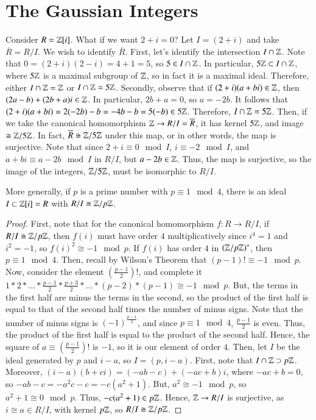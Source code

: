 \documentclass[12pt, a4paper, oneside, openright, titlepage]{book}
\begin{document}
\section{\textsection The Gaussian Integers}

\begin{eg}
        Consider $R = \mathbb Z[i]$. What if we want $2+i = 0$? Let $I = (2+i)$ and take $\overline{R} = R/I$. We wish to identify $\overline{R}$. First, let's identify the intersection $I \cap \mathbb Z$. Note that $0 = (2+i)(2-i) = 4+1 = 5$, so $5 \in I\cap \mathbb Z$. In particular, $5\mathbb Z \subset I\cap \mathbb Z$, where $5\mathbb Z$ is a maximal subgroup of $\mathbb Z$, so in fact it is a maximal ideal. Therefore, either $I\cap \mathbb Z = \mathbb Z$ or $I\cap \mathbb Z = 5\mathbb Z$. Secondly, observe that if $(2+i)(a+bi) \in \mathbb Z$, then $(2a-b)+(2b+a)i \in \mathbb Z$. In particular, $2b+a = 0$, so $a = -2b$. It follows that $(2+i)(a+bi) = 2(-2b)-b = -4b - b = 5(-b) \in 5\mathbb Z$. Therefore, $I\cap \mathbb Z = 5\mathbb Z$. Then, if we take the canonical homomorphism $\mathbb Z\rightarrow R/I = \overline{R}$, it has kernel $5\mathbb Z$, and image $\cong \mathbb Z/5\mathbb Z$. In fact, $\overline{R} \cong \mathbb Z/5\mathbb Z$ under this map, or in other words, the map is surjective. Note that since $2+i \equiv 0 \mod I$, $i \equiv -2 \mod I$, and $a+bi \equiv a-2b \mod I$ in $R/I$, but $a-2b \in \mathbb Z$. Thus, the map is surjective, so the image of the integers, $\mathbb Z/5\mathbb Z$, must be isomorphic to $R/I$.
\end{eg}

\begin{thm}
        More generally, if $p$ is a prime number with $p\equiv 1 \mod 4$, there is an ideal $I \subset \mathbb Z[i]=R$ with $R/I \cong \mathbb Z/p\mathbb Z$.
\end{thm}
\begin{proof}
        First, note that for the canonical homomorphism $f:R\rightarrow R/I$, if $R/I \cong \mathbb Z/p\mathbb Z$, then $f(i)$ must have order $4$ multiplicatively since $i^4 = 1$ and $i^2 = -1$, so $f(i)^2 \cong -1 \mod p$. If $f(i)$ has order $4$ in $(\mathbb Z/p\mathbb Z)^*$, then $p \equiv 1 \mod 4$. Then, recall by Wilson's Theorem that $(p-1)! \equiv -1 \mod p$. Now, consider the element $\left(\frac{p-1}{2}\right)!$, and complete it $1*2*...*\frac{p-1}{2}*\frac{p+3}{2}*...*(p-2)*(p-1) \cong -1 \mod p$. But, the terms in the first half are minus the terms in the second, so the product of the first half is equal to that of the second half times the number of minus signs. Note that the number of minus signs is $(-1)^{\frac{p-1}{2}}$, and since $p \equiv 1 \mod 4$, $\frac{p-1}{2}$ is even. Thus, the product of the first half is equal to the product of the second half. Hence, the square of $a\equiv\left(\frac{p-1}{2}\right)!$ is $-1$, so it is our element of order $4$. Then, let $I$ be the ideal generated by $p$ and $i-a$, so $I = (p,i-a)$. First, note that $I\cap \mathbb Z \supset p\mathbb Z$. Moreover, $(i-a)(b+ci) = (-ab-c)+(-ac+b)i$, where $-ac +b = 0$, so $-ab-c = -a^2c-c = -c(a^2+1)$. But, $a^2 \cong -1 \mod p$, so $a^2 + 1 \cong 0 \mod p$. Thus, $-c(a^2+1) \in p\mathbb Z$. Hence, $\mathbb Z\rightarrow R/I$ is surjective, as $i\cong a \in R/I$, with kernel $p\mathbb Z$, so $R/I\cong \mathbb Z/p\mathbb Z$.
\end{proof}
\end{document}
